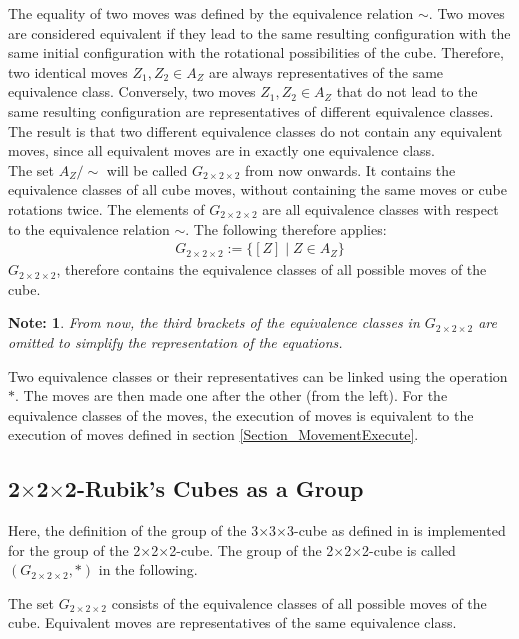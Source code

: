 \documentclass[12pt,a4paper]{article}
\theoremstyle{custom}
\newtheorem*{note}{Note:}
\newcommand{\Gtwo}{\ensuremath{G_{2\times 2\times 2}}}
\newcommand{\Ttwo}{2$\times$2$\times$2-}
\newcommand{\Tthree}{3$\times$3$\times$3-}
\begin{document}
The equality of two moves was defined by the equivalence relation $\sim$. Two moves are considered equivalent if they lead to the same resulting configuration with the same initial configuration with the rotational possibilities of the cube. Therefore, two identical moves $Z_1, Z_2 \in A_Z$ are always representatives of the same equivalence class. Conversely, two moves $Z_1, Z_2 \in A_Z$ that do not lead to the same resulting configuration are representatives of different equivalence classes.\\
The result is that two different equivalence classes do not contain any equivalent moves, since all equivalent moves are in exactly one equivalence class.\\
The set $A_Z / \sim$ will be called $\Gtwo$ from now onwards. It contains the equivalence classes of all cube moves, without containing the same moves or cube rotations twice.
The elements of $\Gtwo$ are all equivalence classes with respect to the equivalence relation $\sim$. The following therefore applies:
\begin{align*}
\Gtwo := \{[Z] \mid Z \in A_Z \}
\end{align*}
$\Gtwo$, therefore contains the equivalence classes of all possible moves of the cube. 

\begin{note}
From now, the third brackets of the equivalence classes in $\Gtwo$ are omitted to simplify the representation of the equations.
\end{note}
Two equivalence classes or their representatives can be linked using the operation $\scriptstyle*$. The moves are then made one after the other (from the left). For the equivalence classes of the moves, the execution of moves is equivalent to the execution of moves defined in section \ref{Section_MovementExecute}.


\subsection{ \Ttwo Rubik's Cubes as a Group}
 \label{Section_CubeAsGroup}

Here, the definition of the group of the \Tthree cube as defined in \cite{JC} is implemented for the group of the \Ttwo cube. The group of the \Ttwo cube is called $\left(\Gtwo, \scriptstyle*\right)$ in the following.


The set $\Gtwo$ consists of the equivalence classes of all possible moves of the cube. Equivalent moves are representatives of the same equivalence class.
\end{document}
